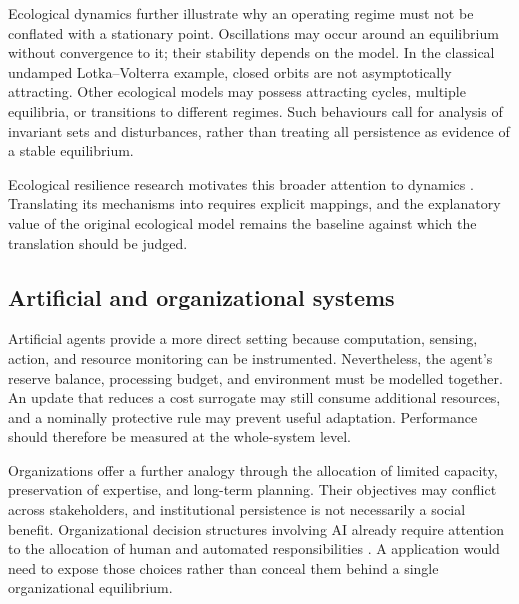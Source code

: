 Ecological dynamics further illustrate why an operating regime must not be conflated with a stationary point. Oscillations may occur around an equilibrium without convergence to it; their stability depends on the model. In the classical undamped Lotka--Volterra example, closed orbits are not asymptotically attracting. Other ecological models may possess attracting cycles, multiple equilibria, or transitions to different regimes. Such behaviours call for analysis of invariant sets and disturbances, rather than treating all persistence as evidence of a stable equilibrium.

Ecological resilience research motivates this broader attention to dynamics \citep{folke2006resilience}. Translating its mechanisms into \uvif{} requires explicit mappings, and the explanatory value of the original ecological model remains the baseline against which the translation should be judged.

\subsection{Artificial and organizational systems}
Artificial agents provide a more direct setting because computation, sensing, action, and resource monitoring can be instrumented. Nevertheless, the agent's reserve balance, processing budget, and environment must be modelled together. An update that reduces a cost surrogate may still consume additional resources, and a nominally protective rule may prevent useful adaptation. Performance should therefore be measured at the whole-system level.

Organizations offer a further analogy through the allocation of limited capacity, preservation of expertise, and long-term planning. Their objectives may conflict across stakeholders, and institutional persistence is not necessarily a social benefit. Organizational decision structures involving AI already require attention to the allocation of human and automated responsibilities \citep{shrestha2019decision}. A \uvif{} application would need to expose those choices rather than conceal them behind a single organizational equilibrium.
